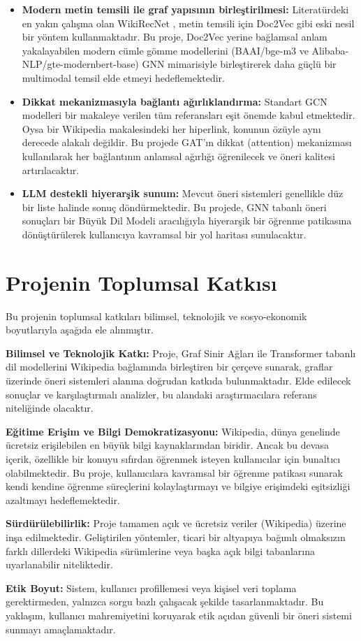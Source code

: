 \begin{itemize}
    \item \textbf{Modern metin temsili ile graf yapısının birleştirilmesi:} Literatürdeki en yakın çalışma olan WikiRecNet \cite{wikirecnet2020}, metin temsili için Doc2Vec gibi eski nesil bir yöntem kullanmaktadır. Bu proje, Doc2Vec yerine bağlamsal anlam yakalayabilen modern cümle gömme modellerini (BAAI/bge-m3 ve Alibaba-NLP/gte-modernbert-base) GNN mimarisiyle birleştirerek daha güçlü bir multimodal temsil elde etmeyi hedeflemektedir.

    \item \textbf{Dikkat mekanizmasıyla bağlantı ağırlıklandırma:} Standart GCN modelleri bir makaleye verilen tüm referansları eşit önemde kabul etmektedir. Oysa bir Wikipedia makalesindeki her hiperlink, konunun özüyle aynı derecede alakalı değildir. Bu projede GAT'ın dikkat (attention) mekanizması kullanılarak her bağlantının anlamsal ağırlığı öğrenilecek ve öneri kalitesi artırılacaktır.

    \item \textbf{LLM destekli hiyerarşik sunum:} Mevcut öneri sistemleri genellikle düz bir liste halinde sonuç döndürmektedir. Bu projede, GNN tabanlı öneri sonuçları bir Büyük Dil Modeli aracılığıyla hiyerarşik bir öğrenme patikasına dönüştürülerek kullanıcıya kavramsal bir yol haritası sunulacaktır.
\end{itemize}

\section{Projenin Toplumsal Katkısı}

Bu projenin toplumsal katkıları bilimsel, teknolojik ve sosyo-ekonomik boyutlarıyla aşağıda ele alınmıştır.

\textbf{Bilimsel ve Teknolojik Katkı:}
Proje, Graf Sinir Ağları ile Transformer tabanlı dil modellerini Wikipedia bağlamında birleştiren bir çerçeve sunarak, graflar üzerinde öneri sistemleri alanına doğrudan katkıda bulunmaktadır. Elde edilecek sonuçlar ve karşılaştırmalı analizler, bu alandaki araştırmacılara referans niteliğinde olacaktır.

\textbf{Eğitime Erişim ve Bilgi Demokratizasyonu:}
Wikipedia, dünya genelinde ücretsiz erişilebilen en büyük bilgi kaynaklarından biridir. Ancak bu devasa içerik, özellikle bir konuyu sıfırdan öğrenmek isteyen kullanıcılar için bunaltıcı olabilmektedir. Bu proje, kullanıcılara kavramsal bir öğrenme patikası sunarak kendi kendine öğrenme süreçlerini kolaylaştırmayı ve bilgiye erişimdeki eşitsizliği azaltmayı hedeflemektedir.

\textbf{Sürdürülebilirlik:}
Proje tamamen açık ve ücretsiz veriler (Wikipedia) üzerine inşa edilmektedir. Geliştirilen yöntemler, ticari bir altyapıya bağımlı olmaksızın farklı dillerdeki Wikipedia sürümlerine veya başka açık bilgi tabanlarına uyarlanabilir niteliktedir.

\textbf{Etik Boyut:}
Sistem, kullanıcı profillemesi veya kişisel veri toplama gerektirmeden, yalnızca sorgu bazlı çalışacak şekilde tasarlanmaktadır. Bu yaklaşım, kullanıcı mahremiyetini koruyarak etik açıdan güvenli bir öneri sistemi sunmayı amaçlamaktadır.
